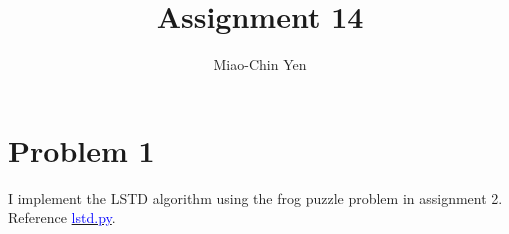 \documentclass{article}
\title{Assignment 14}
\author{Miao-Chin Yen}
\begin{document}
\maketitle

\section*{Problem 1}
I implement the LSTD algorithm using the frog puzzle problem in assignment 2. Reference \href{https://github.com/miaochin/RL-book/tree/master/CME241_assignments/assignment14}{\textcolor{blue}{lstd.py}}.
\end{document}

